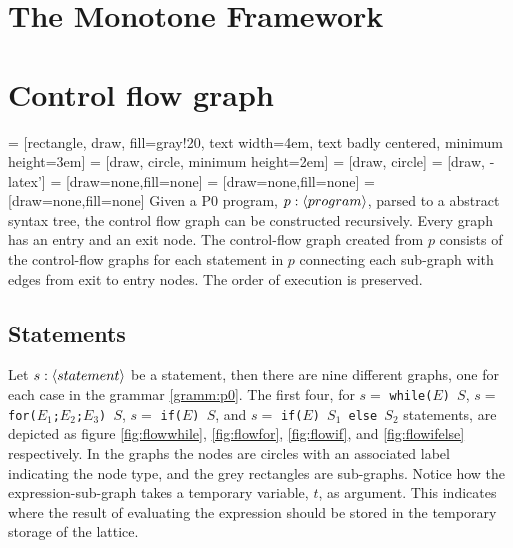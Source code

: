 \section{The Monotone Framework}




\clearpage
\section{Control flow graph}
 = [rectangle, draw, fill=gray!20, text width=4em, text badly centered, minimum height=3em]
 = [draw, circle, minimum height=2em]
 = [draw, circle]
 = [draw, -latex']
 = [draw=none,fill=none]
 = [draw=none,fill=none]
 = [draw=none,fill=none]
Given a P0 program, $p : \langle program\rangle$, parsed to a abstract syntax tree, the control flow graph can be constructed recursively. Every graph has an entry and an exit node. The control-flow graph created from $p$ consists of the control-flow graphs for each statement in $p$ connecting each sub-graph with edges from exit to entry nodes. The order of execution is preserved. 
\subsection{Statements}
Let $s : \langle statement\rangle$ be a statement, then there are nine different graphs, one for each case in the grammar \ref{gramm:p0}. The first four, for $s = $ \texttt{while($E$) $S$}, $s = $ \texttt{for($E_1$;$ E_2$;$E_3$) $S$}, $s = $ \texttt{if($E$) $S$}, and $s = $ \texttt{if($E$) $S_1$ else $S_2$} statements, are depicted as figure \ref{fig:flowwhile}, \ref{fig:flowfor}, \ref{fig:flowif}, and \ref{fig:flowifelse} respectively. In the graphs the nodes are circles with an associated label indicating the node type, and the grey rectangles are sub-graphs. Notice how the expression-sub-graph takes a temporary variable, $t$, as argument. This indicates where the result of evaluating the expression should be stored in the temporary storage of the lattice. 


